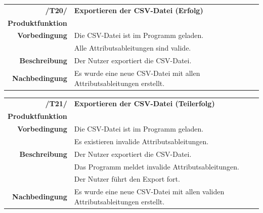 \documentclass{article}
\begin{document}
\begin{table}[H]
\begin{tabularx}{\textwidth}{rX}
 \vspace{1mm}
\textbf{/T20/}         & \textbf{Exportieren der CSV-Datei (Erfolg)} \\ \vspace{1mm}
\textbf{Produktfunktion} & \nameref{sec:f:CSV-Datei exportieren}\\
\textbf{Vorbedingung}  & Die CSV-Datei ist im Programm geladen. \\ \vspace{1mm} & Alle Attributsableitungen sind valide. \\ \vspace{1mm}
\textbf{Beschreibung}  & Der Nutzer exportiert die CSV-Datei. \\
\textbf{Nachbedingung} & Es wurde eine neue CSV-Datei mit allen Attributsableitungen erstellt.
\end{tabularx}
\end{table}

\begin{table}[H]
\begin{tabularx}{\textwidth}{rX}
 \vspace{1mm}
\textbf{/T21/}         & \textbf{Exportieren der CSV-Datei (Teilerfolg)} \\ \vspace{1mm}
\textbf{Produktfunktion} & \nameref{sec:f:CSV-Datei exportieren} \\
\textbf{Vorbedingung}  & Die CSV-Datei ist im Programm geladen. \\ \vspace{1mm} & Es existieren invalide Attributsableitungen. \\
\textbf{Beschreibung}  & Der Nutzer exportiert die CSV-Datei. \\ & Das Programm meldet invalide Attributsableitungen. \\ \vspace{1mm} & Der Nutzer führt den Export fort. \\
\textbf{Nachbedingung} & Es wurde eine neue CSV-Datei mit allen validen Attributsableitungen erstellt.
\end{tabularx}
\end{table}
\end{document}
